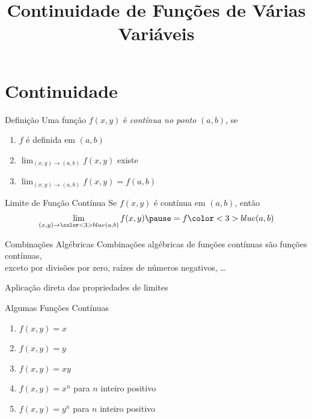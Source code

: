 \documentclass[fleqn,utf8,aspectratio=169,12pt]{beamer}
\title{Continuidade de Funções de Várias Variáveis}
\begin{document}
\addtitle

\section{Continuidade}

\begin{frame}{Definição}
  Uma função \(f(x, y)\) é \emph{contínua no ponto} $(a, b)$, se

  \vspace{0.5\baselineskip}
  \begin{enumerate}[<+->]
    \setlength\itemsep{1.5em}
    \item $f$ é definida em \((a, b)\)
    \item \(\lim_{(x, y)\to(a, b)} f(x, y)\) existe
    \item \(\lim_{(x, y)\to(a, b)} f(x, y) = f(a, b)\)
  \end{enumerate}

  \vspace{\baselineskip}
\end{frame}

\begin{frame}{Limite de Função Contínua}
  Se \(f(x, y)\) é contínua em $(a, b)$,
  \pause
  então
  \[
    \lim_{(x, y)\to{\color<3>{blue}(a, b)}} f(x, y) \pause = f{\color<3>{blue}(a, b)}
  \]
\end{frame}

\begin{frame}{Combinações Algébricas}
  Combinações algébricas de funções contínuas são funções contínuas, \\
  exceto por divisões por zero, raízes de números negativos, \dots

  \pause
  \vspace{\baselineskip}
  Aplicação direta das propriedades de limites
\end{frame}

\begin{frame}{Algumas Funções Contínuas}
  \begin{enumerate}[<+->]
    \item \(f(x, y) = x\)
    \item \(f(x, y) = y\)
    \item \(f(x, y) = xy\)
    \item \(f(x, y) = x^n\) para $n$ inteiro positivo
    \item \(f(x, y) = y^n\) para $n$ inteiro positivo
  \end{enumerate}
\end{frame}
\end{document}
